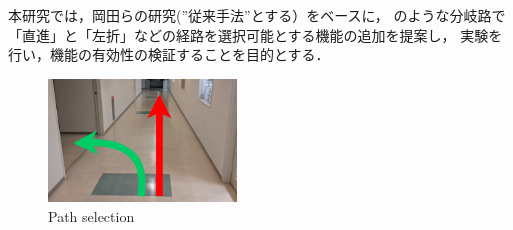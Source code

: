 \documentclass[10pt]{jarticle}
\begin{document}
    本研究では，岡田らの研究\cite{okada}(”従来手法”とする）をベースに，
    のような分岐路で「直進」と「左折」などの経路を選択可能とする機能の追加を提案し，
    実験を行い，機能の有効性の検証することを目的とする．

        \begin{figure}[htb]
            \centering
            \includegraphics[width=5cm]{./fig/zyuzibunki.png}
            \caption{Path selection}
            \label{fig:bunki}
        \end{figure}
    
           
\end{document}
